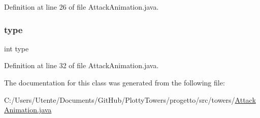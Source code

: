 Definition at line 26 of file Attack\+Animation.\+java.

\mbox{\label{classtowers_1_1_attack_animation_ac765329451135abec74c45e1897abf26}} 
\subsubsection{\texorpdfstring{type}{type}}
{\footnotesize\ttfamily int type\hspace{0.3cm}{\ttfamily [private]}}



Definition at line 32 of file Attack\+Animation.\+java.



The documentation for this class was generated from the following file\+:\begin{DoxyCompactItemize}
\item 
C\+:/\+Users/\+Utente/\+Documents/\+Git\+Hub/\+Plotty\+Towers/progetto/src/towers/\hyperlink{_attack_animation_8java}{Attack\+Animation.\+java}\end{DoxyCompactItemize}
